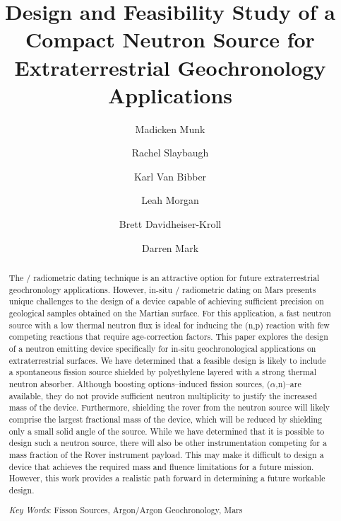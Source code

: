 \documentclass{mc2015}
\begin{document}
\title{Design and Feasibility Study of a Compact Neutron Source for Extraterrestrial Geochronology Applications}

\author{Madicken Munk}
\author{Rachel Slaybaugh}
\author{Karl Van Bibber}

\author{Leah Morgan}
\author{Brett Davidheiser-Kroll}
\author{Darren Mark}

\maketitle

\begin{abstract}
The / radiometric dating technique is an attractive option for future extraterrestrial geochronology applications. However, in-situ / radiometric dating on Mars presents unique challenges to the design of a device capable of achieving sufficient precision on geological samples obtained on the Martian surface. For this application, a fast neutron source with a low thermal neutron flux is ideal for inducing the (n,p) reaction with few competing reactions that require age-correction factors. This paper explores the design of a neutron emitting device specifically for in-situ geochronological applications on extraterrestrial surfaces. We have determined that a feasible design is likely to include a  spontaneous fission source shielded by polyethylene layered with a strong thermal neutron absorber. Although boosting options--induced fission sources, ($\alpha$,n)--are available, they do not provide sufficient neutron multiplicity to justify the increased mass of the device. Furthermore, shielding the rover from the neutron source will likely comprise the largest fractional mass of the device, which will be reduced by shielding only a small solid angle of the source. While we have determined that it is possible to design such a neutron source, there will also be other instrumentation competing for a mass fraction of the Rover instrument payload. This may make it difficult to design a device that achieves the required mass and fluence limitations for a future mission. However, this work provides a realistic path forward in determining a future workable design. 

\emph{Key Words}: Fisson Sources, Argon/Argon Geochronology, Mars
\end{abstract}
\end{document}
